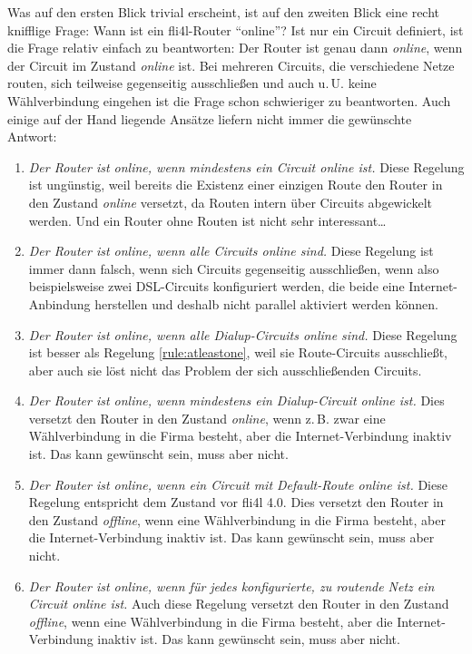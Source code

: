
Was auf den ersten Blick trivial erscheint, ist auf den zweiten Blick eine
recht knifflige Frage: Wann ist ein fli4l-Router ``online''? Ist nur ein
Circuit definiert, ist die Frage relativ einfach zu beantworten: Der Router
ist genau dann \emph{online}, wenn der Circuit im Zustand \emph{online} ist.
Bei mehreren Circuits, die verschiedene Netze routen, sich teilweise
gegenseitig ausschließen und auch u.\,U. keine Wählverbindung eingehen ist die
Frage schon schwieriger zu beantworten. Auch einige auf der Hand liegende
Ansätze liefern nicht immer die gewünschte Antwort:

\begin{enumerate}
\item\label{rule:atleastone} \emph{Der Router ist online, wenn mindestens ein
Circuit online ist.} Diese Regelung ist ungünstig, weil bereits die Existenz
einer einzigen Route den Router in den Zustand \emph{online} versetzt, da Routen
intern über Circuits abgewickelt werden. Und ein Router ohne Routen ist nicht
sehr interessant\dots
\item \emph{Der Router ist online, wenn alle Circuits online sind.}
Diese Regelung ist immer dann falsch, wenn sich Circuits gegenseitig
ausschließen, wenn also beispielsweise zwei DSL-Circuits konfiguriert werden,
die beide eine Internet-Anbindung herstellen und deshalb nicht parallel
aktiviert werden können.
\item \emph{Der Router ist online, wenn alle Dialup-Circuits online sind.}
Diese Regelung ist besser als Regelung \ref{rule:atleastone}, weil sie
Route-Circuits ausschließt, aber auch sie löst nicht das Problem der sich
ausschließenden Circuits.
\item \emph{Der Router ist online, wenn mindestens ein Dialup-Circuit online
ist.} Dies versetzt den Router in den Zustand \emph{online}, wenn z.\,B. zwar
eine Wählverbindung in die Firma besteht, aber die Internet-Verbindung inaktiv
ist. Das kann gewünscht sein, muss aber nicht.
\item\label{rule:default} \emph{Der Router ist online, wenn ein Circuit mit
Default-Route online ist.} Diese Regelung entspricht dem Zustand vor fli4l 4.0.
Dies versetzt den Router in den Zustand \emph{offline}, wenn eine Wählverbindung
in die Firma besteht, aber die Internet-Verbindung inaktiv ist. Das kann
gewünscht sein, muss aber nicht.
\item \emph{Der Router ist online, wenn für jedes konfigurierte, zu routende
Netz ein Circuit online ist.} Auch diese Regelung versetzt den Router in den
Zustand \emph{offline}, wenn eine Wählverbindung in die Firma besteht, aber die
Internet-Verbindung inaktiv ist. Das kann gewünscht sein, muss aber nicht.
\end{enumerate}

